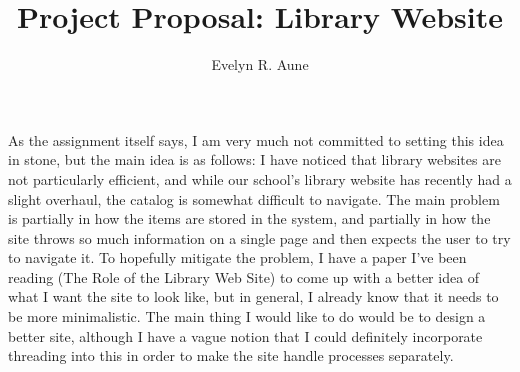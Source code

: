 \documentclass[12pt,letterpaper,notitlepage]{report}
\title{Project Proposal: Library Website}
\author{Evelyn R. Aune}
\begin{document}
\maketitle

As the assignment itself says, I am very much not committed to setting this idea in stone, but the main idea is as follows: I have noticed that library websites are not particularly efficient, and while our school's library website has recently had a slight overhaul, the catalog is somewhat difficult to navigate. The main problem is partially in how the items are stored in the system, and partially in how the site throws so much information on a single page and then expects the user to try to navigate it. To hopefully mitigate the problem, I have a paper I've been reading (The Role of the Library Web Site) to come up with a better idea of what I want the site to look like, but in general, I already know that it needs to be more minimalistic. The main thing I would like to do would be to design a better site, although I have a vague notion that I could definitely incorporate threading into this in order to make the site handle processes separately.
\end{document}
